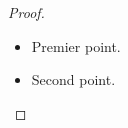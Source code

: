 \begin{proof}
  \begin{itemize}
    \item Premier point.
    \item Second point. \qedhere
  \end{itemize}
\end{proof}
